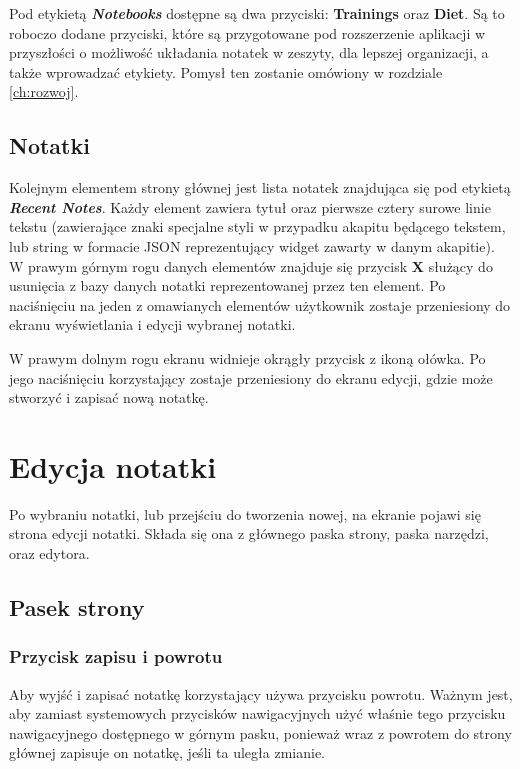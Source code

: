 Pod etykietą \textbf{\textit{Notebooks}} dostępne są dwa przyciski: \textbf{Trainings} oraz \textbf{Diet}. Są to roboczo dodane przyciski, które są przygotowane pod rozszerzenie aplikacji w przyszłości o możliwość układania notatek w zeszyty, dla lepszej organizacji, a także wprowadzać etykiety.
Pomysł ten zostanie omówiony w rozdziale \ref{ch:rozwoj}.

\subsection{Notatki}

Kolejnym elementem strony głównej jest lista notatek znajdująca się pod etykietą \textbf{\textit{Recent Notes}}. Każdy element zawiera tytuł oraz pierwsze cztery surowe linie tekstu (zawierające znaki specjalne styli w przypadku akapitu będącego tekstem, lub string w formacie JSON reprezentujący widget zawarty w danym akapitie).
W prawym górnym rogu danych elementów znajduje się przycisk \textbf{X} służący do usunięcia z bazy danych notatki reprezentowanej przez ten element.
Po naciśnięciu na jeden z omawianych elementów użytkownik zostaje przeniesiony do ekranu wyświetlania i edycji wybranej notatki.

W prawym dolnym rogu ekranu widnieje okrągły przycisk z ikoną ołówka.
Po jego naciśnięciu korzystający zostaje przeniesiony do ekranu edycji, gdzie może stworzyć i zapisać nową notatkę.

\section{Edycja notatki}

Po wybraniu notatki, lub przejściu do tworzenia nowej, na ekranie pojawi się strona edycji notatki. Składa się ona z głównego paska strony, paska narzędzi, oraz edytora.

\subsection{Pasek strony}

\subsubsection{Przycisk zapisu i powrotu}

Aby wyjść i zapisać notatkę korzystający używa przycisku powrotu.
Ważnym jest, aby zamiast systemowych przycisków nawigacyjnych użyć właśnie tego przycisku nawigacyjnego dostępnego w górnym pasku, ponieważ wraz z powrotem do strony głównej zapisuje on notatkę, jeśli ta uległa zmianie.

